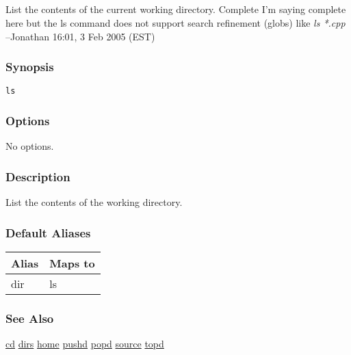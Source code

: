 \subsection{}
\label{ls}
List the contents of the current working directory. 
 Complete I'm saying complete here but the ls command does not support search refinement (globs) like \emph{ls *.cpp}
 --Jonathan 16:01, 3 Feb 2005 (EST) 
\subsubsection*{Synopsis}
\begin{verbatim}
ls
\end{verbatim}
\subsubsection*{Options}
 No options. 
\subsubsection*{Description}
 List the contents of the working directory. 
\subsubsection*{Default Aliases}
\begin{tabular}{|l|l|}
\hline 
 Alias  & Maps to  \\
 \hline 
 dir  & ls  \\
 \hline 
\end{tabular}
\subsubsection*{See Also}
\hyperref[cd]{cd} \hyperref[dirs]{dirs} \hyperref[home]{home} \hyperref[pushd]{pushd} \hyperref[popd]{popd} \hyperref[source]{source} \hyperref[topd]{topd} 